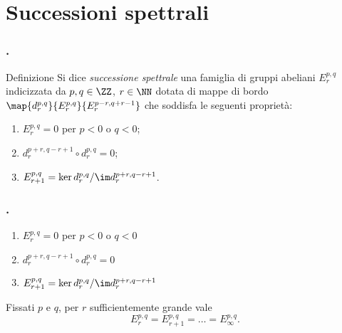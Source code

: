 \section{Successioni spettrali}
\newcommand*{\sseqOne}{\(E^{p,q}_r=0\) per \(p<0\) o \(q<0\)}
\newcommand*{\sseqTwo}{\(d^{p+r,q-r+1}_r\circ d^{p,q}_r=0\)}
\newcommand*{\sseqThree}{\(E^{p,q}_{r+1}=\ker d^{p,q}_r/\im d^{p+r,q-r+1}_r\)}
\begin{frame}
\frametitle{.}
\begin{block}{Definizione}
Si dice \emph{successione spettrale} una famiglia di gruppi abeliani \(E^{p,q}_r\) indicizzata da \(p,q\in\ZZ\), \(r\in\NN\) dotata di mappe di bordo \(\map{d^{p,q}_r}{E^{p,q}_r}{E^{p-r,q+r-1}_r}\) che soddisfa le seguenti proprietà:
\begin{enumerate}
\item \sseqOne;
\item \(d^{p+r,q-r+1}_r\circ d^{p,q}_r=0\);
\item \(E^{p,q}_{r+1}=\ker d^{p,q}_r/\im d^{p+r,q-r+1}_r\).
\end{enumerate}
\end{block}
\end{frame}
\begin{frame}
\frametitle{.}
\begin{overprint}
\begin{enumerate}
\item \sseqOne
\end{enumerate}
\begin{enumerate}
\setcounter{enumi}{1}
\item \sseqTwo
\end{enumerate}
\begin{enumerate}
\setcounter{enumi}{2}
\item \sseqThree
\end{enumerate}
Fissati \(p\) e \(q\), per \(r\) sufficientemente grande vale
\[
E^{p,q}_r=E^{p,q}_{r+1}=\ldots=E^{p,q}_\infty.
\]
\end{overprint}
\vfill
\begin{overprint}
\centering{}
\centering{}
\centering{}
\centering{}
\end{overprint}
\end{frame}
